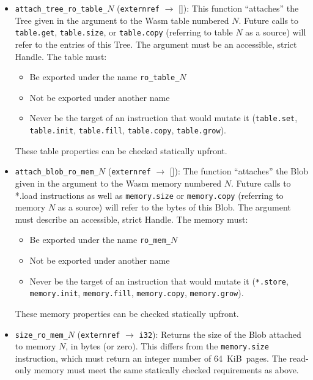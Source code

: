 \documentclass{article}
\newcommand{\blob}{\textrm{Blob}\xspace}
\newcommand{\tree}{\textrm{Tree}\xspace}
\newcommand{\handle}{\textrm{Handle}\xspace}
\begin{document}
\begin{itemize}
\item \texttt{attach\_tree\_ro\_table\_}$N$ (\texttt{externref}
  $\rightarrow$ []): This function ``attaches'' the \tree given in the
  argument to the Wasm table numbered $N$. Future calls to
  \texttt{table.get}, \texttt{table.size}, or \texttt{table.copy}
  (referring to table $N$ as a source) will refer to the entries of
  this \tree. The argument must be an accessible, strict
  \handle. The table must:
  \begin{itemize}[topsep=0pt, itemsep=0pt]
  \item Be exported under the name \texttt{ro\_table\_}$N$
  \item Not be exported under another name
  \item Never be the target of an instruction that would mutate it (\texttt{table.set},
    \texttt{table.init}, \texttt{table.fill}, \texttt{table.copy}, \texttt{table.grow}).
  \end{itemize}
  These table properties can be checked statically upfront.

\item \texttt{attach\_blob\_ro\_mem\_}$N$ (\texttt{externref} $\rightarrow$ []): The function ``attaches''
  the \blob given in the argument to the Wasm memory numbered $N$. Future calls to
  *.load instructions as well as \texttt{memory.size} or \texttt{memory.copy} (referring to memory $N$ as a source)
  will refer to the bytes of this \blob. The argument must describe an accessible, strict \handle. The memory must:
    \begin{itemize}[topsep=0pt, itemsep=0pt]
  \item Be exported under the name \texttt{ro\_mem\_}$N$
  \item Not be exported under another name
  \item Never be the target of an instruction that would mutate it (\texttt{*.store},
    \texttt{memory.init}, \texttt{memory.fill}, \texttt{memory.copy}, \texttt{memory.grow}).
  \end{itemize}
  These memory properties can be checked statically upfront.

\item \texttt{size\_ro\_mem\_}$N$ (\texttt{externref} $\rightarrow$
  \texttt{i32}): Returns the size of the \blob attached to memory $N$,
  in bytes (or zero). This differs from the \texttt{memory.size}
  instruction, which must return an integer number of
  64~KiB~pages. The read-only memory must meet the same statically
  checked requirements as above.


\end{itemize}
\end{document}
